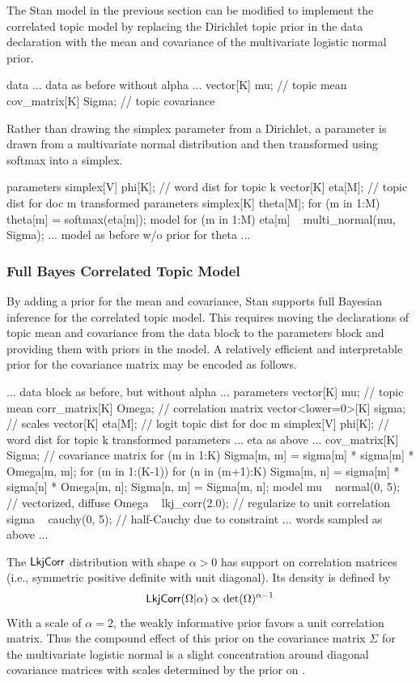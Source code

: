The Stan model in the previous section can be modified to implement
the correlated topic model by replacing the Dirichlet topic prior
 in the data declaration with the mean and covariance of
the multivariate logistic normal prior.
%
\begin{stancode}
data {
  ... data as before without alpha ...
  vector[K] mu;          // topic mean
  cov_matrix[K] Sigma;   // topic covariance 
}
\end{stancode}
%
Rather than drawing the simplex parameter  from a
Dirichlet, a parameter  is drawn from a multivariate normal
distribution and then transformed using softmax into a simplex.
%
\begin{stancode}
parameters {
  simplex[V] phi[K];  // word dist for topic k
  vector[K] eta[M];   // topic dist for doc m
}
transformed parameters {
  simplex[K] theta[M];
  for (m in 1:M)
    theta[m] = softmax(eta[m]);
}
model {
  for (m in 1:M)
    eta[m] ~ multi_normal(mu, Sigma);
  ... model as before w/o prior for theta ...
}
\end{stancode}

\subsubsection{Full Bayes Correlated Topic Model}

By adding a prior for the mean and covariance, Stan supports full
Bayesian inference for the correlated topic model.  This requires
moving the declarations of topic mean  and covariance  
from the data block to the parameters block and providing them with
priors in the model.  A relatively efficient and interpretable prior
for the covariance matrix  may be encoded as follows.
%
\begin{stancode}
... data block as before, but without alpha ...
parameters {
  vector[K] mu;              // topic mean
  corr_matrix[K] Omega;      // correlation matrix
  vector<lower=0>[K] sigma;  // scales
  vector[K] eta[M];          // logit topic dist for doc m
  simplex[V] phi[K];         // word dist for topic k
}
transformed parameters {
  ... eta as above ...
  cov_matrix[K] Sigma;       // covariance matrix
  for (m in 1:K)
    Sigma[m, m] = sigma[m] * sigma[m] * Omega[m, m];
  for (m in 1:(K-1)) {
    for (n in (m+1):K) {
      Sigma[m, n] = sigma[m] * sigma[n] * Omega[m, n];
      Sigma[n, m] = Sigma[m, n];
    }
  }
}
model {
  mu ~ normal(0, 5);      // vectorized, diffuse
  Omega ~ lkj_corr(2.0);  // regularize to unit correlation
  sigma ~ cauchy(0, 5);   // half-Cauchy due to constraint
  ... words sampled as above ...
}
\end{stancode}
%
The $\distro{LkjCorr}$ distribution with shape $\alpha > 0$ has support
on correlation matrices (i.e., symmetric positive definite with unit
diagonal).  Its density is defined by
\[
\distro{LkjCorr}(\Omega|\alpha) \propto \mbox{det}(\Omega)^{\alpha - 1}
\]
With a scale of $\alpha = 2$, the weakly informative prior favors a
unit correlation matrix.  Thus the compound effect of this prior on
the covariance matrix $\Sigma$ for the multivariate logistic normal is
a slight concentration around diagonal covariance matrices with scales
determined by the prior on .


